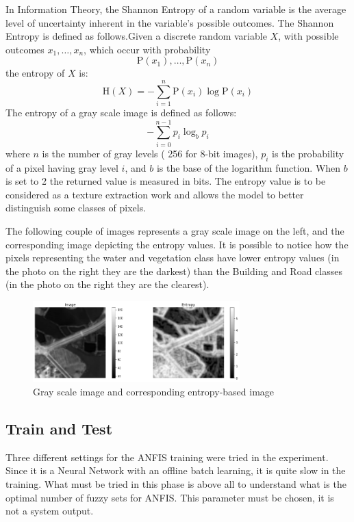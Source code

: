 \documentclass[10pt,twocolumn,letterpaper]{article}
\begin{document}
In Information Theory, the Shannon Entropy of a random variable is the average level of uncertainty  inherent in the variable's possible outcomes. The Shannon Entropy is defined as follows.Given a discrete random variable $X$, with possible outcomes $ x_{1}, \ldots, x_{n}$, which occur with probability $$\mathrm{P}\left(x_{1}\right), \ldots,\mathrm{P}\left(x_{n}\right)$$the entropy of $X$ is:
$$
\mathrm{H}(X)=-\sum_{i=1}^{n} \mathrm{P}\left(x_{i}\right) \log \mathrm{P}\left(x_{i}\right)
$$
The entropy of a gray scale image is defined as follows:
$$
-\sum_{i=0}^{n-1} p_{i} \log _{b} p_{i}
$$
where $n$ is the number of gray levels ( 256 for 8-bit images), $p_{i}$ is the probability of a pixel having gray level $i$, and $b$ is the base of the logarithm function. When $b$ is set to 2 the returned value is measured in bits.
The entropy value is to be considered as a texture extraction work and allows the model to better distinguish some classes of pixels.

The following couple of images represents a gray scale image on the left, and the corresponding image depicting the entropy values. It is possible to notice how the pixels representing the water and vegetation class have lower entropy values (in the photo on the right they are the darkest) than the Building and Road classes (in the photo on the right they are the clearest). 

\begin{figure}[h]
\includegraphics[width=8cm]{images/entropy.png}
\caption{Gray scale image and corresponding entropy-based image}
\end{figure}

\subsection{Train and Test}

Three different settings for the ANFIS training were tried in the experiment. Since it is a Neural Network with an offline batch learning, it is quite slow in the training. What must be tried in this phase is above all to understand what is the optimal number of fuzzy sets for ANFIS. This parameter must be chosen, it is not a system output.
\end{document}
